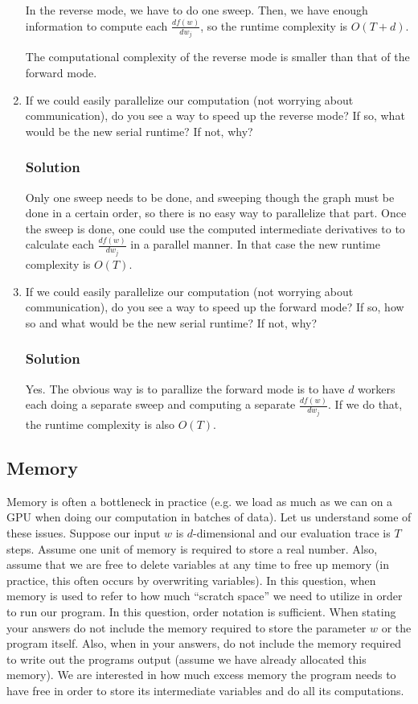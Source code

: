 \documentclass[letterpaper,11pt]{article}
\begin{document}
\begin{enumerate}
  In the reverse mode, we have to do one sweep. Then, we have enough
  information to compute each $\frac{df(w)}{dw_j}$, so the runtime complexity is
  $O(T + d)$.

  The computational complexity of the reverse mode is smaller than that of the
  forward mode.
  
  \item If we could easily parallelize our computation (not worrying about
    communication), do you see a way to speed up the reverse mode? If so, what
    would be the new serial runtime? If not, why?
    \subsubsection*{Solution}

    Only one sweep needs to be done, and sweeping though the graph must be done
    in a certain order, so there is no easy way to parallelize that part. Once
    the sweep is done, one could use the computed intermediate derivatives to to
    calculate each $\frac{df(w)}{dw_j}$ in a parallel manner. In that case the
    new runtime complexity is $O(T)$.
    
  \item If we could easily parallelize our computation (not worrying about
    communication), do you see a way to speed up the forward mode? If so, how so
    and what would be the new serial runtime? If not, why?
    \subsubsection*{Solution}

    Yes. The obvious way is to parallize the forward mode is to have $d$ workers
    each doing a separate sweep and computing a separate
    $\frac{df(w)}{dw_j}$. If we do that, the runtime complexity is also $O(T)$.
\end{enumerate}

\subsection*{Memory}

Memory is often a bottleneck in practice (e.g. we load as much as we can on a
GPU when doing our computation in batches of data). Let us understand some of
these issues.  Suppose our input $w$ is $d$-dimensional and our evaluation trace
is $T$ steps. Assume one unit of memory is required to store a real
number. Also, assume that we are free to delete variables at any time to free up
memory (in practice, this often occurs by overwriting variables).  In this
question, when memory is used to refer to how much ``scratch space'' we need to
utilize in order to run our program. In this question, order notation is
sufficient. When stating your answers do not include the memory required to
store the parameter $w$ or the program itself. Also, when in your answers, do
not include the memory required to write out the programs output (assume we have
already allocated this memory). We are interested in how much excess memory the
program needs to have free in order to store its intermediate variables and do
all its computations.
\end{document}
